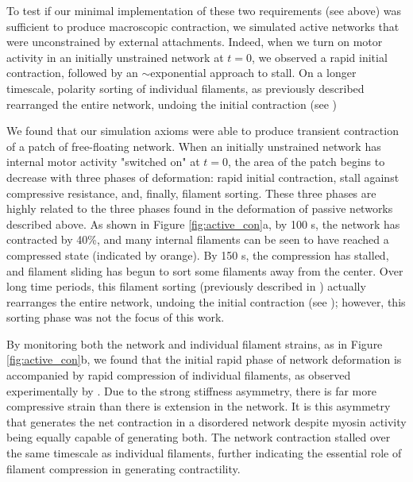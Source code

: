 \documentclass[10pt,letterpaper]{article}
\begin{document}
To test if our minimal implementation of these two requirements (see above) was sufficient to produce macroscopic contraction, we simulated active networks that were unconstrained by external attachments.
Indeed, when we turn on motor activity in an initially unstrained network at $t=0$, we observed a rapid initial contraction, followed by an $\sim$exponential approach to stall.  On a longer timescale, polarity sorting of individual filaments, as previously described  \cite{Ndlec:1997aa,Surrey1167} rearranged the entire network, undoing the initial contraction (see )


We found that our simulation axioms were able to produce transient contraction of a patch of free-floating network.  When an initially unstrained network has internal motor activity "switched on" at $t=0$, the area of the patch begins to decrease with three phases of deformation:  rapid initial contraction, stall against compressive resistance, and, finally, filament sorting.  These three phases are highly related to the three phases found in the deformation of passive networks described above. As shown in Figure \ref{fig:active_con}a, by 100 s, the network has contracted by 40\%, and many internal filaments can be seen to have reached a compressed state (indicated by orange).  By 150 s, the compression has stalled, and filament sliding has begun to sort some filaments away from the center. Over long time periods, this filament sorting (previously described in \cite{Ndlec:1997aa,Surrey1167}) actually rearranges the entire network, undoing the initial contraction (see ); however, this sorting phase was not the focus of this work.  


By monitoring both the network and individual filament strains, as in Figure \ref{fig:active_con}b, we found that the initial rapid phase of network deformation is accompanied by rapid compression of individual filaments, as observed experimentally by \cite{rheo_2D1}.  Due to the strong stiffness asymmetry, there is far more compressive strain than there is extension in the network. It is this asymmetry that generates the net contraction in a disordered network despite myosin activity being equally capable of generating both.  The network contraction stalled over the same timescale as individual filaments, further indicating the essential role of filament compression in generating contractility.  
\end{document}
